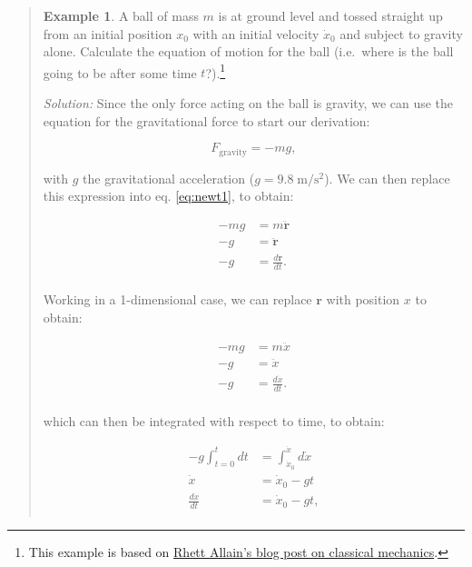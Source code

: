 \documentclass[
  english,
  9pt,
]{extbook}
\theoremstyle{definition}
\theoremstyle{definition}
\newtheorem{example}{Example}[chapter]
\theoremstyle{definition}
\theoremstyle{definition}
\theoremstyle{remark}
\begin{document}
\begin{quote}
\begin{example}
\protect\hypertarget{exm:newtonianEx}{}\label{exm:newtonianEx}A ball of mass \(m\) is at ground level and tossed straight up from an initial position \(x_0\) with an initial velocity \(\dot{x}_0\) and subject to gravity alone. Calculate the equation of motion for the ball (i.e.~where is the ball going to be after some time \(t\)?).\footnote{This example is based on \href{https://rhettallain.com/2018/10/31/classical-mechanics-newtonian-lagrangian-and-hamiltonian/}{Rhett Allain's blog post on classical mechanics}.}

\emph{Solution:} Since the only force acting on the ball is gravity, we can use the equation for the gravitational force to start our derivation:

\begin{equation}
F_{\mathrm{gravity}}=-mg,
\end{equation}

with \(g\) the gravitational acceleration (\(g=9.8\; \mathrm{m}/\mathrm{s}^{2}\)). We can then replace this expression into eq. \eqref{eq:newt1}, to obtain:

\begin{equation}
\begin{aligned}
-mg &=m \ddot{\mathbf{r}} \\
-g &=\ddot{\mathbf{r}} \\
-g &=\frac{d\dot{\mathbf{r}}}{dt}. \\
\end{aligned}
\end{equation}

Working in a 1-dimensional case, we can replace \(\mathbf{r}\) with position \(x\) to obtain:

\begin{equation}
\begin{aligned}
-mg &=m \ddot{x} \\
-g &=\ddot{x} \\
-g &=\frac{d\dot{x}}{dt}. \\
\end{aligned}
\end{equation}

which can then be integrated with respect to time, to obtain:

\begin{equation}
\begin{aligned}
-g\int_{t=0}^{t} dt &=\int_{\dot{x}_0}^{\dot{x}} d\dot{x}\\
\dot{x} &= \dot{x}_0-gt\\
\frac{dx}{dt} &= \dot{x}_0-gt,\\
\end{aligned}
\end{equation}


\end{example}
\end{quote}
\end{document}
